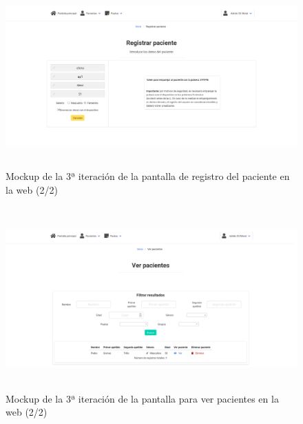 \begin{figure}[H]
    \centering
    \includegraphics[height=7cm, width=\textwidth]{Imagenes/04DescProblema/mockups/v3/web/03-registrarPaciente-2.png}
    \caption[Mockup de la 3ª iteración de la pantalla de registro del paciente en la web (2/2)]{Mockup de la 3ª iteración de la pantalla de registro del paciente en la web (2/2)}
    \label{c4:fig:v3:web:registroPaciente2}
\end{figure}

\begin{figure}[H]
    \centering
    \includegraphics[height=7cm, width=\textwidth]{Imagenes/04DescProblema/mockups/v3/web/04-verPacientes.png}
    \caption[Mockup de la 3ª iteración de la pantalla para ver pacientes en la web]{Mockup de la 3ª iteración de la pantalla para ver pacientes en la web (2/2)}
    \label{c4:fig:v3:web:verPacientes}
\end{figure}


